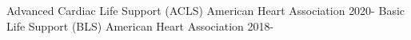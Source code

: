 


\begin{cvhonors}

   \cvhonor
    {Advanced Cardiac Life Support (ACLS)}
    {American Heart Association}
    {}
    {2020-}
    \cvhonor
    {Basic Life Support (BLS)}
    {American Heart Association}
    {}
    {2018-} %
 
    
    

\end{cvhonors}
